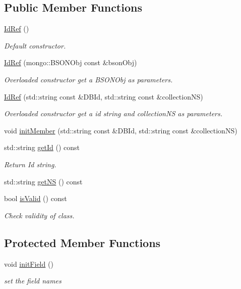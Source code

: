 \subsection*{Public Member Functions}
\begin{DoxyCompactItemize}
\item 
\hyperlink{classunisys_1_1IdRef_ac1f80a3c9603e25bf73ea649b571c628}{Id\-Ref} ()
\begin{DoxyCompactList}\small\item\em Default constructor. \end{DoxyCompactList}\item 
\hyperlink{classunisys_1_1IdRef_a02027d11b26a6e4131525c346186976d}{Id\-Ref} (mongo\-::\-B\-S\-O\-N\-Obj const \&bson\-Obj)
\begin{DoxyCompactList}\small\item\em Overloaded constructor get a B\-S\-O\-N\-Obj as parameters. \end{DoxyCompactList}\item 
\hyperlink{classunisys_1_1IdRef_afdfaf736d758f9ee321557e63a2257de}{Id\-Ref} (std\-::string const \&D\-B\-Id, std\-::string const \&collection\-N\-S)
\begin{DoxyCompactList}\small\item\em Overloaded constructor get a id string and collection\-N\-S as parameters. \end{DoxyCompactList}\item 
void \hyperlink{classunisys_1_1IdRef_a797643add7a57839526d8561156631fe}{init\-Member} (std\-::string const \&D\-B\-Id, std\-::string const \&collection\-N\-S)
\item 
std\-::string \hyperlink{classunisys_1_1IdRef_a9e002479bf85ca26d965018108036151}{get\-Id} () const 
\begin{DoxyCompactList}\small\item\em Return Id string. \end{DoxyCompactList}\item 
std\-::string \hyperlink{classunisys_1_1IdRef_aa4430b934e5305c1bdeae7bd15adeb70}{get\-N\-S} () const 
\item 
bool \hyperlink{classunisys_1_1IdRef_a4ab596023020171bceeb2aed8bd529ce}{is\-Valid} () const 
\begin{DoxyCompactList}\small\item\em Check validity of class. \end{DoxyCompactList}\end{DoxyCompactItemize}
\subsection*{Protected Member Functions}
\begin{DoxyCompactItemize}
\item 
void \hyperlink{classunisys_1_1IdRef_a2f8143648ba349f8a910ee64b10c0829}{init\-Field} ()
\begin{DoxyCompactList}\small\item\em set the field names \end{DoxyCompactList}\end{DoxyCompactItemize}
